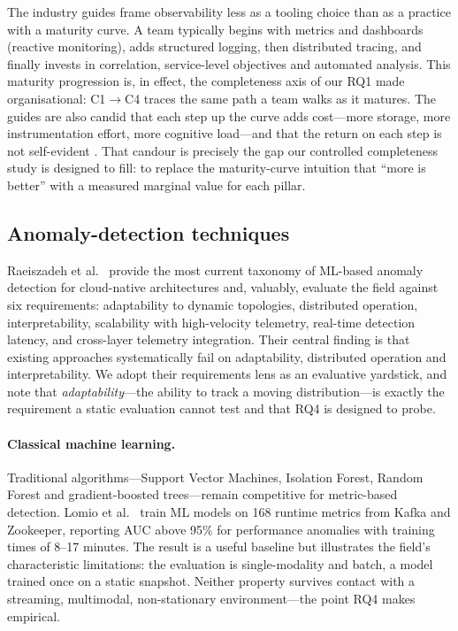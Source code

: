 \documentclass[acmsmall]{acmart}
\begin{document}
The industry guides \cite{aws2022obs,beginnersobs,leadingobs} frame observability less as a tooling choice than as a practice with a maturity curve. A team typically begins with metrics and dashboards (reactive monitoring), adds structured logging, then distributed tracing, and finally invests in correlation, service-level objectives and automated analysis. This maturity progression is, in effect, the completeness axis of our RQ1 made organisational: C1$\rightarrow$C4 traces the same path a team walks as it matures. The guides are also candid that each step up the curve adds cost---more storage, more instrumentation effort, more cognitive load---and that the return on each step is not self-evident \cite{leadingobs}. That candour is precisely the gap our controlled completeness study is designed to fill: to replace the maturity-curve intuition that ``more is better'' with a measured marginal value for each pillar.

\subsection{Anomaly-detection techniques}\label{sec:bg-ad}

Raeiszadeh et al.\ \cite{raeiszadeh2026} provide the most current taxonomy of ML-based anomaly detection for cloud-native architectures and, valuably, evaluate the field against six requirements: adaptability to dynamic topologies, distributed operation, interpretability, scalability with high-velocity telemetry, real-time detection latency, and cross-layer telemetry integration. Their central finding is that existing approaches systematically fail on adaptability, distributed operation and interpretability. We adopt their requirements lens as an evaluative yardstick, and note that \emph{adaptability}---the ability to track a moving distribution---is exactly the requirement a static evaluation cannot test and that RQ4 is designed to probe.

\paragraph{Classical machine learning.} Traditional algorithms---Support Vector Machines, Isolation Forest, Random Forest and gradient-boosted trees---remain competitive for metric-based detection. Lomio et al.\ \cite{lomio2022} train ML models on 168 runtime metrics from Kafka and Zookeeper, reporting AUC above 95\% for performance anomalies with training times of 8--17 minutes. The result is a useful baseline but illustrates the field's characteristic limitations: the evaluation is single-modality and batch, a model trained once on a static snapshot. Neither property survives contact with a streaming, multimodal, non-stationary environment---the point RQ4 makes empirical.
\end{document}
